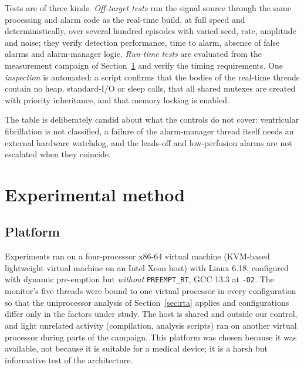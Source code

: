 \documentclass[preprint,3p,10pt]{elsarticle}
\begin{document}
Tests are of three kinds. \emph{Off-target tests} run the signal source through the same processing and alarm code as the real-time build, at full speed and deterministically, over several hundred episodes with varied seed, rate, amplitude and noise; they verify detection performance, time to alarm, absence of false alarms and alarm-manager logic. \emph{Run-time tests} are evaluated from the measurement campaign of Section~\ref{sec:method} and verify the timing requirements. One \emph{inspection} is automated: a script confirms that the bodies of the real-time threads contain no heap, standard-I/O or sleep calls, that all shared mutexes are created with priority inheritance, and that memory locking is enabled.

The table is deliberately candid about what the controls do not cover: ventricular fibrillation is not classified, a failure of the alarm-manager thread itself needs an external hardware watchdog, and the leads-off and low-perfusion alarms are not escalated when they coincide.

\section{Experimental method}
\label{sec:method}
\subsection{Platform}
Experiments ran on a four-processor x86-64 virtual machine (KVM-based lightweight virtual machine on an Intel Xeon host) with Linux 6.18, configured with dynamic pre-emption but \emph{without} \texttt{PREEMPT\_RT}, GCC 13.3 at \texttt{-O2}. The monitor's five threads were bound to one virtual processor in every configuration so that the uniprocessor analysis of Section~\ref{sec:rta} applies and configurations differ only in the factors under study. The host is shared and outside our control, and light unrelated activity (compilation, analysis scripts) ran on another virtual processor during parts of the campaign. This platform was chosen because it was available, not because it is suitable for a medical device; it is a harsh but informative test of the architecture.
\end{document}
